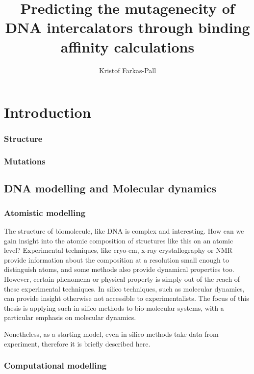 \documentclass{report}
\title{Predicting the mutagenecity of DNA intercalators through binding affinity calculations}
\author{Kristof Farkas-Pall}
\begin{document}
\maketitle

\tableofcontents

\chapter{Introduction}



\subsection{Structure}

\subsection{Mutations}

\section{DNA modelling and Molecular dynamics}

\subsection{Atomistic modelling}

The structure of biomolecule, like DNA is complex and interesting. How can we gain insight into the atomic composition of structures like this on an atomic level? Experimental techniques, like cryo-em, x-ray crystallography or NMR provide information about the composition at a resolution small enough to distinguish atoms, and some methods also provide dynamical properties too. However, certain phenomena or physical property is simply out of the reach of these experimental techniques. In silico techniques, such as molecular dynamics, can provide insight otherwise not accessible to experimentalists. The focus of this thesis is applying such in silico methods to bio-molecular systems, with a particular emphasis on molecular dynamics. 

Nonetheless, as a starting model, even in silico methods take data from experiment, therefore it is briefly described here.



\subsection{Computational modelling}
\end{document}
